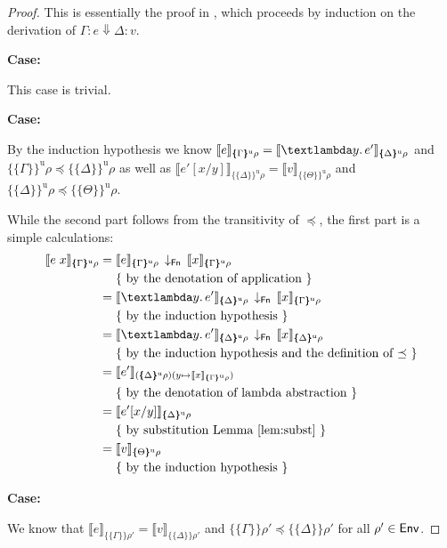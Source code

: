 \documentclass{jfp1}
\theoremstyle{nonumberbreak}
\newtheorem{proof}{Proof}
\newcommand{\sEnv}  {\text{\textsf{Env}}}
\newcommand{\sFnProj}[2]{#1\,\downarrow_{\text{\textsf{Fn}}}\,#2}
\newcommand{\sApp}[2]{#1\;#2}
\newcommand{\sLam}[2]{\text{\textlambda} #1.\, #2}
\newcommand{\sred}[4]{#1 : #2 \Downarrow #3 : #4}
\newcommand{\sRule}[1]{\text{{\textsc{#1}}}}
\newcommand{\dsem}[2]{\llbracket #1 \rrbracket_{#2}}
\newcommand{\esem}[1]{\{\!\!\!\{#1\}\!\!\!\}}
\newcommand{\esemu}[1]{\{\!\!\!\{#1\}\!\!\!\}^{\text{u}}}
\newcommand{\case}[1]{\par\smallskip\noindent\textbf{Case:} #1\nopagebreak\par\noindent\ignorespaces}
\newcommand{\aexpl}[1]{&\mathrel{\phantom{=}}\left\{\text{ #1 }\right\}}
\begin{document}
\begin{proof}
This is essentially the proof in \cite{launchbury}, which proceeds by induction on the derivation of $\sred \Gamma e \Delta v$.

\case{\sRule{Lam}}
This case is trivial.

\case{\sRule{App}}
By the induction hypothesis we know
$\dsem{e}{\esemu{\Gamma}\rho} = \dsem{\sLam y {e'}}{\esemu{\Delta}\rho}$ and $\esemu{\Gamma}\rho \preceq \esemu{\Delta}\rho$ as well as $\dsem{e'[x/y]}{\esemu{\Delta}\rho} = \dsem{v}{\esemu{\Theta}\rho}$ and $\esemu{\Delta}\rho \preceq \esemu{\Theta}\rho$.

While the second part follows from the transitivity of $\preceq$, the first part is a simple calculations:
\begin{align*}
\dsem{\sApp{e}{x}}{\esemu{\Gamma}\rho} &= \sFnProj{\dsem{e}{\esemu{\Gamma}\rho}}{\dsem{x}{\esemu{\Gamma}{\rho}}}\\
\aexpl{by the denotation of application} \\
&= \sFnProj{\dsem{\sLam y {e'}}{\esemu{\Delta}\rho}}{\dsem{x}{\esemu{\Gamma}{\rho}}}\\ 
\aexpl{by the induction hypothesis} \\
&= \sFnProj{\dsem{\sLam y {e'}}{\esemu{\Delta}\rho}}{\dsem{x}{\esemu{\Delta}{\rho}}}\\ 
\aexpl{by the induction hypothesis and the definition of $\preceq$} \\
&= \dsem{e'}{(\esemu{\Delta}\rho)(y \mapsto \dsem{x}{\esemu{\Gamma}{\rho}})}\\ 
\aexpl{by the denotation of lambda abstraction} \\
&= \dsem{e'[x/y]}{\esemu{\Delta}\rho}\\ 
\aexpl{by substitution Lemma \ref{lem:subst}} \\
&= \dsem{v}{\esemu{\Theta}\rho}\\
\aexpl{by the induction hypothesis}
\end{align*}

\case{\sRule{Var}}
We know that $\dsem{e}{\esem{\Gamma}\rho'}=\dsem{v}{\esem{\Delta}\rho'}$ and $\esem{\Gamma}\rho' \preceq \esem{\Delta}\rho'$ for all $\rho'\in\sEnv$.


\end{proof}
\end{document}
